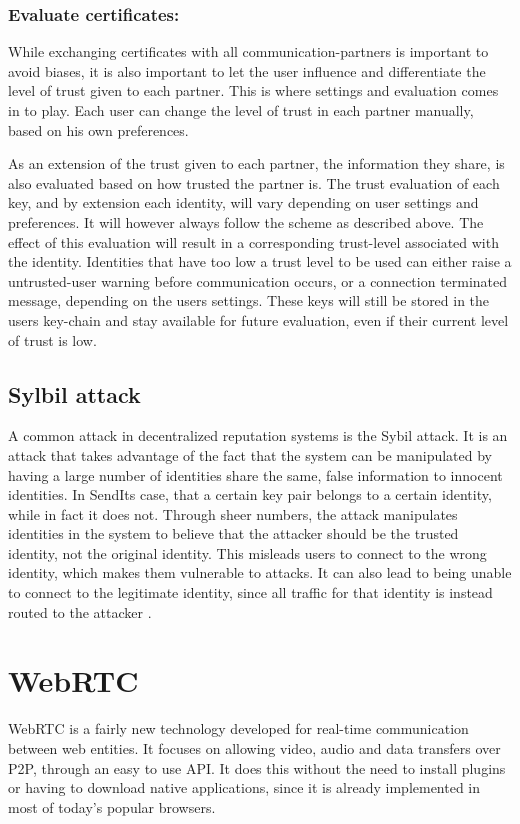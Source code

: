         \subsubsection*{Evaluate certificates:}
        While exchanging certificates with all communication-partners is important to avoid biases, it is also important to let the user influence and differentiate the level of trust given to each partner. This is where settings and evaluation comes in to play. Each user can change the level of trust in each partner manually, based on his own preferences.

        As an extension of the trust given to each partner, the information they share, is also evaluated based on how trusted the partner is. The trust evaluation of each key, and by extension each identity, will vary depending on user settings and preferences. It will however always follow the scheme as described above. The effect of this evaluation will result in a corresponding trust-level associated with the identity. Identities that have too low a trust level to be used can either raise a untrusted-user warning before communication occurs, or a connection terminated message, depending on the users settings. These keys will still be stored in the users key-chain and stay available for future evaluation, even if their current level of trust is low.

    \subsection{Sylbil attack}
    \label{sec:trust_syl}
    A common attack in decentralized reputation systems is the Sybil attack. It is an attack that takes advantage of the fact that the system can be manipulated by having a large number of identities share the same, false information to innocent identities. In SendIts case, that a certain key pair belongs to a certain identity, while in fact it does not. Through sheer numbers, the attack manipulates identities in the system to believe that the attacker should be the trusted identity, not the original identity. This misleads users to connect to the wrong identity, which makes them vulnerable to attacks. It can also lead to being unable to connect to the legitimate identity, since all traffic for that identity is instead routed to the attacker \cite{lncs_sybil}.

%
\section{WebRTC}
\label{sec:webrtc}
%
    WebRTC is a fairly new technology developed for real-time communication between web entities. It focuses on allowing video, audio and data transfers over P2P, through an easy to use API. It does this without the need to install plugins or having to download native applications, since it is already implemented in most of today's popular browsers. 

